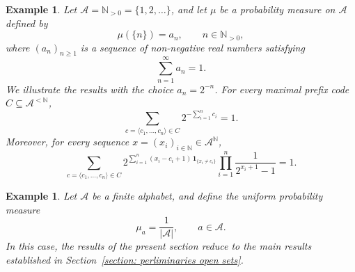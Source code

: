 \documentclass[a4,12pt]{article}%
\newtheorem{example}[theorem]{Example}
\begin{document}
\begin{example}
Let $\mathcal{A} = \mathbb{N}_{>0} = \{1,2,\dots\}$, and let $\mu$ be a probability measure on $\mathcal{A}$ defined by
\[
\mu(\{n\}) = a_n, \qquad n \in \mathbb{N}_{>0},
\]
where $(a_n)_{n \ge 1}$ is a sequence of non-negative real numbers satisfying
\[
\sum_{n=1}^{\infty} a_n = 1.
\]
We illustrate the results with the choice $a_n = 2^{-n}$. For every maximal prefix code $C \subseteq \mathcal{A}^{<\mathbb{N}}$,
\[
\sum_{c = \langle c_1, \ldots, c_n \rangle \in C}
2^{-\sum_{i=1}^{n} c_i}
= 1.
\]
Moreover, for every sequence $x = (x_i)_{i \in \mathbb{N}} \in \mathcal{A}^{\mathbb{N}}$,
\[
\sum_{c = \langle c_1, \ldots, c_n \rangle \in C}
2^{\sum_{i=1}^{n} (x_i - c_i + 1)\,
\mathbf{1}_{\{x_i \neq c_i\}}}
\prod_{i=1}^{n} \frac{1}{2^{x_i+1} - 1}
= 1.
\]
\end{example}

\begin{example}
Let $\mathcal{A}$ be a finite alphabet, and define the uniform probability measure
\[
\mu_a = \frac{1}{|\mathcal{A}|}, \qquad a \in \mathcal{A}.
\]
In this case, the results of the present section reduce to the main results established in Section~\ref{section: perliminaries open sets}.
\end{example}
\end{document}
